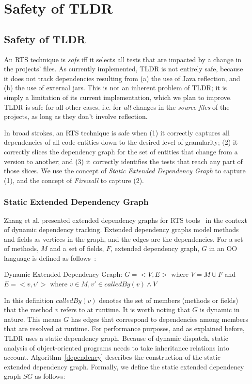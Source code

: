 \chapter{Safety of TLDR}
\label{sec:Implementation}

\section{Safety of TLDR}

An RTS technique is {\em safe} iff it selects all tests that are impacted by a change in the projects' files. As currently implemented, TLDR is not entirely safe, because it does not track dependencies resulting from (a) the use of Java reflection, and (b) the use of external jars. This is not an inherent problem of TLDR; it is simply a limitation of its current implementation, which we plan to improve. TLDR is safe for all other cases, i.e. for {\em all} changes in the {\em source files} of the projects, as long as they don't involve reflection. 

In broad strokes, an RTS technique is safe when (1) it correctly captures all dependencies of all code entities down to the desired level of granularity; (2) it correctly slices the dependency graph for the set of entities that change from a version to another; and (3) it correctly identifies the tests that reach any part of those slices. We use the concept of \textit{Static Extended Dependency Graph} to capture (1), and the concept of \textit{Firewall} to capture (2).

\subsection{Static Extended Dependency Graph}

Zhang et al. presented extended dependency graphs for RTS tools~\cite{b37} in the context of dynamic dependency tracking. Extended dependency graphs model methods and fields as vertices in the graph, and the edges are the dependencies. 
For a set of methods, $M$ and a set of fields, $F$, extended dependency graph, $G$ in an OO language is defined as follows~\cite{b38}: 
\begin{definition}
Dynamic Extended Dependency Graph: $G = <V, E>$ where $ V = M \cup F$ and $E = <v, v'>$ where $v \in M, v' \in \textit{calledBy}(v) \land V$  
\end{definition}
In this definition $calledBy(v)$ denotes the set of members (methods or fields) that the method $v$ refers to at runtime. It is worth noting that $G$ is dynamic in nature. This means $G$ has edges that correspond to dependencies among members that are resolved at runtime. 
For performance purposes, and as explained before, TLDR uses a static dependency graph. Because of dynamic dispatch, static analysis of object-oriented programs needs to take inheritance relations into account. Algorithm~\ref{dependency} describes the construction of the static extended dependency graph. Formally, we define the static extended dependency graph $SG$ as follows:

